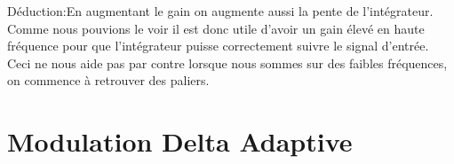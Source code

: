 \documentclass[11pt, openright]{book}
\begin{document}
\begin{dent}{Déduction:}En augmentant le gain on augmente aussi la pente de l'intégrateur. Comme nous pouvions le voir il est donc utile d'avoir un gain élevé en haute fréquence pour que l'intégrateur puisse correctement suivre
    le signal d'entrée. \\

    Ceci ne nous aide pas par contre lorsque nous sommes sur des faibles fréquences, on commence à retrouver des paliers.
\end{dent}

\section{Modulation Delta Adaptive}

\begin{figure}[ht!]
    \begin{floatrow}


    \end{floatrow}
\end{figure}

\begin{figure}[ht!]
    \begin{floatrow}


    \end{floatrow}
\end{figure}
\end{document}
